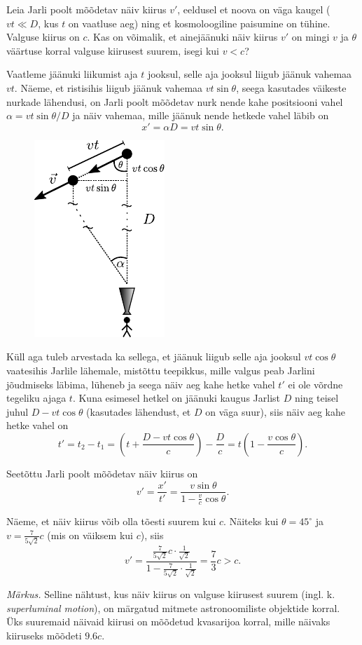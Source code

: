 	Leia Jarli poolt mõõdetav näiv kiirus $v'$, eeldusel et noova on väga kaugel ($vt \ll D$, kus $t$ on vaatluse aeg) ning et kosmoloogiline paisumine on tühine. Valguse kiirus on $c$. Kas on võimalik, et ainejäänuki näiv kiirus $v'$ on mingi $v$ ja $\theta$ väärtuse korral valguse kiirusest suurem, isegi kui $v < c$?
	
	
	
\hint

\solu
Vaatleme jäänuki liikumist aja $t$ jooksul, selle aja jooksul liigub jäänuk vahemaa $vt$. Näeme, et ristisihis liigub jäänuk vahemaa $vt \sin \theta$, seega kasutades väikeste nurkade lähendusi, on Jarli poolt mõõdetav nurk nende kahe positsiooni vahel $\alpha = vt\sin\theta/D$ ja näiv vahemaa, mille jäänuk nende hetkede vahel läbib on
\begin{equation*}
	x' = \alpha D = vt\sin\theta.
\end{equation*}

\begin{figure}[h]
\centering
\includegraphics[width=0.25\linewidth]{2020-lahg-04-yl.pdf}
\end{figure}

Küll aga tuleb arvestada ka sellega, et jäänuk liigub selle aja jooksul $vt \cos\theta$ vaatesihis Jarlile lähemale, mistõttu teepikkus, mille valgus peab Jarlini jõudmiseks läbima, lüheneb ja seega näiv aeg kahe hetke vahel $t'$ ei ole võrdne tegeliku ajaga $t$. Kuna esimesel hetkel on jäänuki kaugus Jarlist $D$ ning teisel juhul $D-vt\cos\theta$ (kasutades lähendust, et $D$ on väga suur), siis näiv aeg kahe hetke vahel on
\begin{equation*}
t' = t_2 - t_1 = \left(t + \frac{D-vt\cos\theta}{c}\right) - \frac{D}{c} = t\left(1 - \frac{v\cos\theta}{c}\right).
\end{equation*}

Seetõttu Jarli poolt mõõdetav näiv kiirus on
\begin{equation*}
v' = \frac{x'}{t'} = \frac{v \sin \theta}{1- \frac{v}{c}\cos\theta}.
\end{equation*}

Näeme, et näiv kiirus võib olla tõesti suurem kui $c$. Näiteks kui $\theta = 45^\circ$ ja $v = \frac{7}{5\sqrt 2}c$ (mis on väiksem kui $c$), siis
\begin{equation*}
v' = \frac{\frac{7}{5\sqrt 2} c \cdot \frac{1}{\sqrt 2}}{1- \frac{7}{5\sqrt 2} \cdot \frac{1}{\sqrt 2}} = \frac{7}{3} c > c.
\end{equation*}

\textit{Märkus.} Selline nähtust, kus näiv kiirus on valguse kiirusest suurem (ingl. k. \textit{superluminal motion}), on märgatud mitmete astronoomiliste objektide korral. Üks suuremaid näivaid kiirusi on mõõdetud kvasarijoa korral, mille näivaks kiiruseks mõõdeti $\num{9.6}c$.
\probend